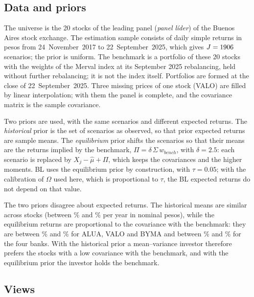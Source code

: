 \documentclass[11pt]{article}
\begin{document}
\subsection{Data and priors}

The universe is the 20 stocks of the leading panel (\emph{panel l\'ider})
of the Buenos Aires stock exchange. The estimation sample consists of daily simple returns in pesos from
24~November~2017 to 22~September~2025, which gives $J = 1906$ scenarios;
the prior is uniform. The benchmark is a portfolio of these 20 stocks with the
weights of the Merval index at its September 2025 rebalancing, held without
further rebalancing; it is not the index itself. Portfolios
are formed at the close of 22~September~2025. Three missing prices of one
stock (VALO) are filled by linear interpolation; with them the panel is
complete, and the covariance matrix is the sample covariance.

Two priors are used, with the same scenarios and different expected
returns. The \emph{historical} prior is the set of scenarios as observed,
so that prior expected returns are sample means. The \emph{equilibrium}
prior shifts the scenarios so that their means are the returns implied by
the benchmark, $\Pi = \delta\,\Sigma\, w_{bench}$, with $\delta = 2.5$:
each scenario is replaced by $X_j - \hat\mu + \Pi$, which keeps the
covariances and the higher moments. BL uses the equilibrium prior by
construction, with $\tau = 0.05$; with the calibration of $\Omega$ used
here, which is proportional to $\tau$, the BL expected returns do not
depend on that value.

The two priors disagree about expected returns. The historical means are
similar across stocks (between \nMuHistMin\% and \nMuHistMax\% per year in
nominal pesos), while the equilibrium returns are proportional to the
covariance with the benchmark: they are between \nPiLowMin\% and
\nPiLowMax\% for ALUA, VALO and BYMA and between \nPiBankMin\% and
\nPiBankMax\% for the four banks. With the historical prior a
mean--variance investor therefore prefers the stocks with a low covariance
with the benchmark, and with the equilibrium prior the investor holds the benchmark.

\subsection{Views}
\end{document}
